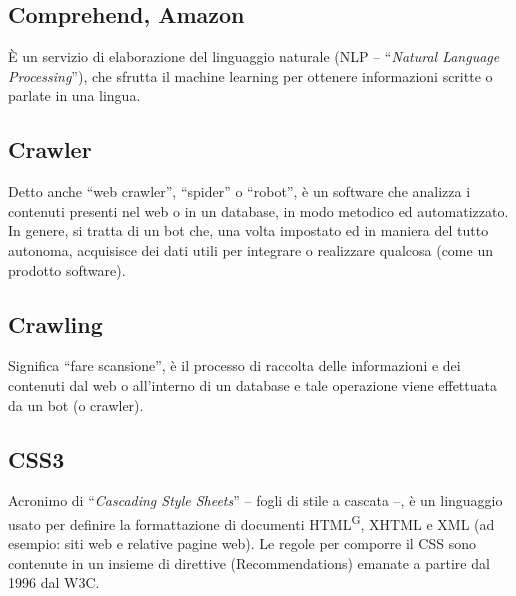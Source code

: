 \subsection{Comprehend, Amazon}
È un servizio di elaborazione del linguaggio naturale (NLP – “\textit{Natural Language Processing}”), che sfrutta il machine learning per ottenere informazioni scritte o parlate in una lingua. 

\subsection{Crawler} Detto anche “web crawler”, “spider” o “robot”, è un software che analizza i contenuti presenti nel web o in un database, in modo metodico ed automatizzato. In genere, si tratta di un bot che, una volta impostato ed in maniera del tutto autonoma, acquisisce dei dati utili per integrare o realizzare qualcosa (come un prodotto software). 

\subsection{Crawling} Significa “fare scansione”, è il processo di raccolta delle informazioni e dei contenuti dal web o all’interno di un database e tale operazione viene effettuata da un bot (o crawler). 

\subsection{CSS3} 
Acronimo di “\textit{Cascading Style Sheets}” – fogli di stile a cascata –, è un linguaggio usato per definire la formattazione di documenti HTML\textsuperscript{G}, XHTML e XML (ad esempio: siti web e relative pagine web). Le regole per comporre il CSS sono contenute in un insieme di direttive (Recommendations) emanate a partire dal 1996 dal W3C. 

\clearpage